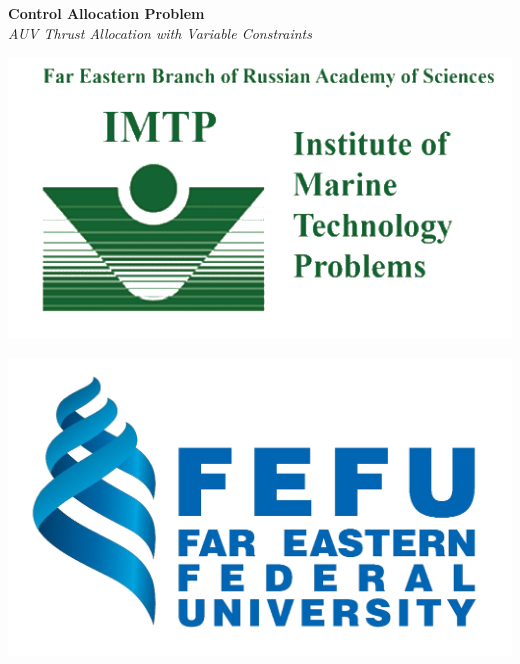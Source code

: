 \documentclass[a0,portrait]{a0poster}
\begin{document}
\begin{minipage}[t]{0.50\linewidth}
\vspace{-8cm}
\begin{flushleft}
\veryHuge \color{NavyBlue} \textbf{Control Allocation Problem} \color{Black}\\ %
\Huge\textit{AUV Thrust Allocation with Variable Constraints}\\ [1cm] %
\end{flushleft}
\end{minipage}
\hfill
\begin{minipage}[t]{0.20\linewidth}
\centering
\includegraphics[width=\linewidth]{fig/logo_imtp.png}
\end{minipage}
\hfill
\begin{minipage}[t]{0.20\linewidth}
\centering
\includegraphics[width=\linewidth]{fig/logo_fefu.png}
\end{minipage}

\vspace{1.5cm}
\end{document}
